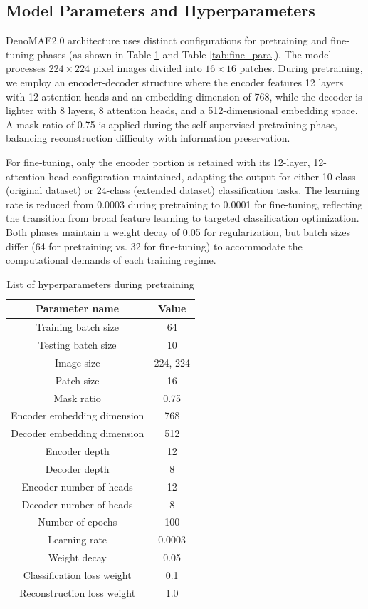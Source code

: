 \subsection{Model Parameters and Hyperparameters}

DenoMAE2.0 architecture uses distinct configurations for pretraining and fine-tuning phases (as shown in Table \ref{tab:pre_para} and Table \ref{tab:fine_para}). The model processes $224 \times 224$ pixel images divided into $16 \times 16$ patches. During pretraining, we employ an encoder-decoder structure where the encoder features 12 layers with 12 attention heads and an embedding dimension of 768, while the decoder is lighter with 8 layers, 8 attention heads, and a 512-dimensional embedding space. A mask ratio of 0.75 is applied during the self-supervised pretraining phase, balancing reconstruction difficulty with information preservation.

For fine-tuning, only the encoder portion is retained with its 12-layer, 12-attention-head configuration maintained, adapting the output for either 10-class (original dataset) or 24-class (extended dataset) classification tasks. The learning rate is reduced from 0.0003 during pretraining to 0.0001 for fine-tuning, reflecting the transition from broad feature learning to targeted classification optimization. Both phases maintain a weight decay of 0.05 for regularization, but batch sizes differ (64 for pretraining vs. 32 for fine-tuning) to accommodate the computational demands of each training regime.

\begin{table}[htbp]
    \centering
    \caption{List of hyperparameters during pretraining}
    \label{tab:pre_para}
    \begin{tabular}{cc}
        \hline
        \textbf{Parameter name} & \textbf{Value} \\ \hline
        Training batch size & 64 \\ 
        Testing batch size & 10 \\ 
        Image size & 224, 224 \\ 
        Patch size & 16 \\ 
        Mask ratio & 0.75 \\ 
        Encoder embedding dimension & 768 \\ 
        Decoder embedding dimension & 512 \\ 
        Encoder depth & 12 \\ 
        Decoder depth & 8 \\ 
        Encoder number of heads & 12 \\ 
        Decoder number of heads & 8 \\ 
        Number of epochs & 100 \\ 
        Learning rate & 0.0003 \\ 
        Weight decay & 0.05 \\ 
        Classification loss weight & 0.1 \\ 
        Reconstruction loss weight & 1.0 \\ 
        \hline
    \end{tabular}
\end{table}


